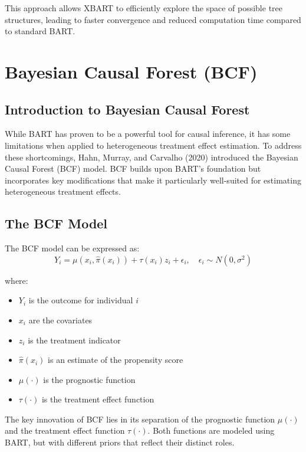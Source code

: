 \documentclass[
  letterpaper,
  DIV=11,
  numbers=noendperiod]{scrreprt}
\providecommand{\tightlist}{%
  \setlength{\itemsep}{0pt}\setlength{\parskip}{0pt}}\usepackage{longtable,booktabs,array}
\begin{document}
This approach allows XBART to efficiently explore the space of possible
tree structures, leading to faster convergence and reduced computation
time compared to standard BART.

\chapter{Bayesian Causal Forest (BCF)}\label{bayesian-causal-forest-bcf}

\section{Introduction to Bayesian Causal
Forest}\label{introduction-to-bayesian-causal-forest}

While BART has proven to be a powerful tool for causal inference, it has
some limitations when applied to heterogeneous treatment effect
estimation. To address these shortcomings, Hahn, Murray, and Carvalho
(2020) introduced the Bayesian Causal Forest (BCF) model. BCF builds
upon BART's foundation but incorporates key modifications that make it
particularly well-suited for estimating heterogeneous treatment effects.

\section{The BCF Model}\label{the-bcf-model}

The BCF model can be expressed as: \[
Y_i = \mu(x_i, \hat{\pi}(x_i)) + \tau(x_i)z_i + \epsilon_i, \quad \epsilon_i \sim N(0, \sigma^2)
\]

where:

\begin{itemize}
\tightlist
\item
  \(Y_i\) is the outcome for individual \(i\)
\item
  \(x_i\) are the covariates
\item
  \(z_i\) is the treatment indicator
\item
  \(\hat{\pi}(x_i)\) is an estimate of the propensity score
\item
  \(\mu(\cdot)\) is the prognostic function
\item
  \(\tau(\cdot)\) is the treatment effect function
\end{itemize}

The key innovation of BCF lies in its separation of the prognostic
function \(\mu(\cdot)\) and the treatment effect function
\(\tau(\cdot)\). Both functions are modeled using BART, but with
different priors that reflect their distinct roles.
\end{document}
